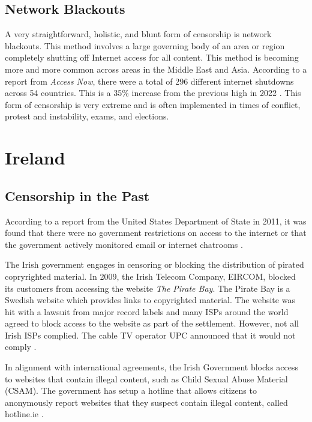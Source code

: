 \subsection{Network Blackouts}

A very straightforward, holistic, and blunt form of censorship is network blackouts. This method involves a large governing body of an area or region completely shutting off Internet access for all content. This method is becoming more and more common across areas in the Middle East and Asia. According to a report from \textit{Access Now}, there were a total of 296 different internet shutdowns across 54 countries. This is a 35\% increase from the previous high in 2022 \cite{inetenetBlackouts}. This form of censorship is very extreme and is often implemented in times of conflict, protest and instability, exams, and elections. 

\section{Ireland}

\subsection{Censorship in the Past}

According to a report from the United States Department of State in 2011, it was found that there were no government restrictions on access to the internet or that the government actively monitored email or internet chatrooms \cite{stateTechnicalDifficulties}.

The Irish government engages in censoring or blocking the distribution of pirated copryrighted material. In 2009, the Irish Telecom Company, EIRCOM, blocked its customers from accessing the website \textit{The Pirate Bay}. The Pirate Bay is a Swedish website which provides links to copyrighted material. The website was hit with a lawsuit from major record labels and many ISPs around the world agreed to block access to the website as part of the settlement. However, not all Irish ISPs complied. The cable TV operator UPC announced that it would not comply \cite{irishtimesEircomBlock}. 

In alignment with international agreements, the Irish Government blocks access to websites that contain illegal content, such as Child Sexual Abuse Material (CSAM). The government has setup a hotline that allows citizens to anonymously report websites that they suspect contain illegal content, called hotline.ie \cite{hotlineAboutx2013}.

